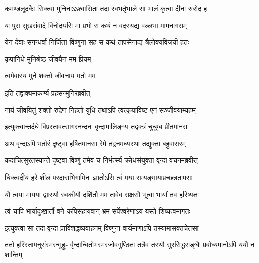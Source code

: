 \twolineshloka
{कमण्डलूदकैः सिक्त्वा मुनिनाऽऽश्वासिता तदा}
{स्वभर्तृभाले सा भालं कृत्वा दीना रुरोद ह} %


\twolineshloka
{यः पुरा सुखसंवादे विनोदयसि मां प्रभो}
{स कथं न वदस्यद्य वल्लभा मामनागसम्} %

\twolineshloka
{येन देवाः सगन्धर्वा निर्जिता विष्णुना सह}
{स कथं तापसेनाद्य त्रैलोक्यविजयी हतः} %





\onelineshloka
{कृपानिधे मुनिश्रेष्ठ जीवयैनं मम प्रियम्} %


त्वमेवास्य मुने शक्तो जीवनाय मतो मम


\onelineshloka
{इति तद्वाक्यमाकर्ण्य प्रहसन्मुनिरब्रवीत्} %


\twolineshloka
{नायं जीवयितुं शक्तो रुद्रेण निहतो युधि}
{तथाऽपि त्वत्कृपाविष्ट एनं सञ्जीवयाम्यहम्} %


\twolineshloka
{इत्युक्त्वान्तर्दधे विप्रस्तावत्सागरनन्दनः}
{वृन्दामालिङ्ग्य तद्वक्त्रं चुचुम्ब प्रीतमानसः} %

\twolineshloka
{अथ वृन्दाऽपि भर्तारं दृष्ट्वा हर्षितमानसा}
{रेमे तद्वनमध्यस्था तद्युक्ता बहुवासरम्} %

\twolineshloka
{कदाचित्सुरतस्यान्ते दृष्ट्वा विष्णुं तमेव च}
{निर्भर्त्स्य क्रोधसंयुक्ता वृन्दा वचनमब्रवीत्} %


\twolineshloka
{धिक्त्वदीयं हरे शीलं परदाराभिगामिनः}
{ज्ञातोऽसि त्वं मया सम्यङ्मायाप्रच्छन्नतापसः} %

\twolineshloka
{यौ त्वया मायया द्वाःस्थौ स्वकीयौ दर्शितौ मम}
{तावेव राक्षसौ भूत्वा भार्यां तव हरिष्यतः} %

\twolineshloka
{त्वं चापि भार्यादुःखार्तो वने कपिसहायवान्}
{भ्रम सर्पेश्वरेणाऽयं यस्ते शिष्यत्वमागतः} %

\twolineshloka
{इत्युक्त्वा सा तदा वृन्दा प्राविशद्धव्यवाहनम्}
{विष्णुना वार्यमाणाऽपि तस्यामासक्तचेतसा} %

\fourlineindentedshloka
{ततो हरिस्तामनुसंस्मरन्मुहु-}
{र्वृन्दान्वितोभस्मरजोवगुण्ठितः}
{तत्रैव तस्थौ सुरसिद्धसङ्घैः}
{प्रबोध्यमानोऽपि ययौ न शान्तिम्} %





